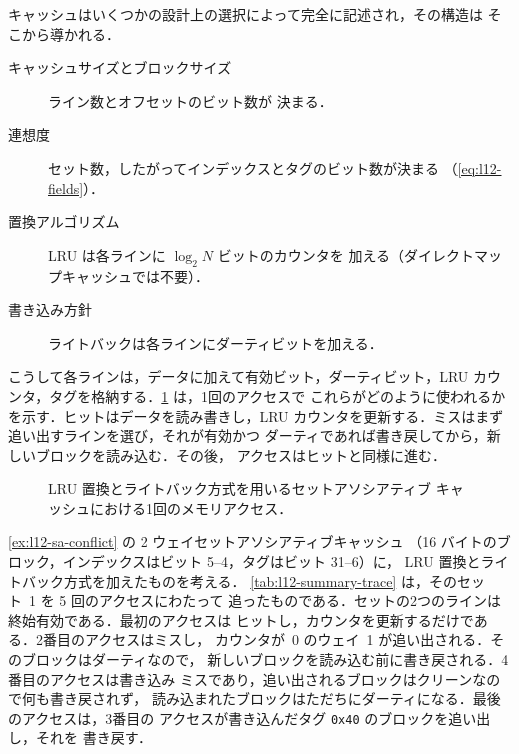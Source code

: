 \documentclass[../main.tex]{subfiles}
\begin{document}
キャッシュはいくつかの設計上の選択によって完全に記述され，その構造は
そこから導かれる．
\begin{description}
  \item[キャッシュサイズとブロックサイズ] ライン数とオフセットのビット数が
    決まる．
  \item[連想度] セット数，したがってインデックスとタグのビット数が決まる
    （\cref{eq:l12-fields}）．
  \item[置換アルゴリズム] LRU は各ラインに $\log_2 N$ ビットのカウンタを
    加える（ダイレクトマップキャッシュでは不要）．
  \item[書き込み方針] ライトバックは各ラインにダーティビットを加える．
\end{description}
こうして各ラインは，データに加えて有効ビット，ダーティビット，LRU
カウンタ，タグを格納する．\cref{fig:l12-access-flow} は，1回のアクセスで
これらがどのように使われるかを示す．ヒットはデータを読み書きし，LRU
カウンタを更新する．ミスはまず追い出すラインを選び，それが有効かつ
ダーティであれば書き戻してから，新しいブロックを読み込む．その後，
アクセスはヒットと同様に進む．

\begin{figure}[htbp]
  \centering
  
  \caption{LRU 置換とライトバック方式を用いるセットアソシアティブ
    キャッシュにおける1回のメモリアクセス．}
  \label{fig:l12-access-flow}
\end{figure}

\begin{example}
  \label{ex:l12-summary-trace}
  \cref{ex:l12-sa-conflict} の 2 ウェイセットアソシアティブキャッシュ
  （16 バイトのブロック，インデックスはビット 5--4，タグはビット 31--6）に，
  LRU 置換とライトバック方式を加えたものを考える．
  \cref{tab:l12-summary-trace} は，そのセット~1 を 5 回のアクセスにわたって
  追ったものである．セットの2つのラインは終始有効である．最初のアクセスは
  ヒットし，カウンタを更新するだけである．2番目のアクセスはミスし，
  カウンタが~0 のウェイ~1 が追い出される．そのブロックはダーティなので，
  新しいブロックを読み込む前に書き戻される．4番目のアクセスは書き込み
  ミスであり，追い出されるブロックはクリーンなので何も書き戻されず，
  読み込まれたブロックはただちにダーティになる．最後のアクセスは，3番目の
  アクセスが書き込んだタグ \texttt{0x40} のブロックを追い出し，それを
  書き戻す．
\end{example}
\end{document}
